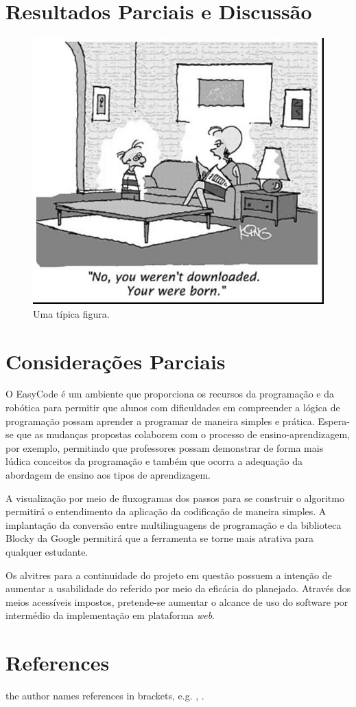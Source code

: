 \documentclass[12pt]{article}
\begin{document}
\section{Resultados Parciais e Discussão}
	\begin{figure}[h]
		\centering
		\includegraphics[scale=0.2]{fig1.jpg}
		\caption{Uma típica figura.}
		\label{fig1}
	\end{figure}

\section{Considerações Parciais}
O EasyCode é um ambiente que proporciona os recursos da programação e da robótica para permitir que alunos com dificuldades em compreender a lógica de programação possam aprender a programar de maneira simples e prática. Espera-se que as mudanças propostas colaborem com o processo de ensino-aprendizagem, por exemplo, permitindo que professores possam demonstrar de forma mais lúdica conceitos da programação e também que ocorra a adequação da abordagem de ensino aos tipos de aprendizagem. 
\par A visualização por meio de fluxogramas dos passos para se construir o algoritmo permitirá o entendimento da aplicação da codificação de maneira simples. A implantação da conversão entre multilinguagens de programação e da biblioteca Blocky da Google permitirá que a ferramenta se torne mais atrativa para qualquer estudante.
\par Os alvitres para a continuidade do projeto em questão possuem a intenção de aumentar a usabilidade do referido por meio da eficácia do planejado. Através dos meios acessíveis impostos, pretende-se aumentar o alcance de uso do software por intermédio da implementação em plataforma \textit{web}. 

\section{References}
the author names references in brackets, e.g. \cite{SILVA:2017}, 
\cite {ANDERSON:2001}.



\end{document}
